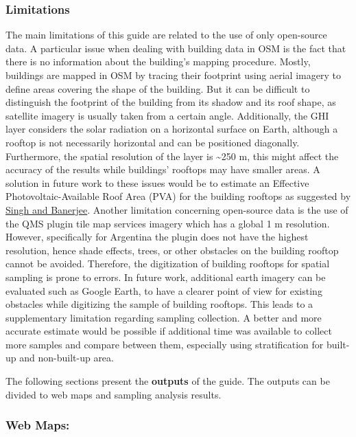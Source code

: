 \documentclass[
]{book}
\begin{document}
\hypertarget{limitations}{%
\subsubsection*{Limitations}\label{limitations}}

The main limitations of this guide are related to the use of only open-source data. A particular issue when dealing with building data in OSM is the fact that there is no information about the building's mapping procedure. Mostly, buildings are mapped in OSM by tracing their footprint using aerial imagery to define areas covering the shape of the building. But it can be difficult to distinguish the footprint of the building from its shadow and its roof shape, as satellite imagery is usually taken from a certain angle. Additionally, the GHI layer considers the solar radiation on a horizontal surface on Earth, although a rooftop is not necessarily horizontal and can be positioned diagonally. Furthermore, the spatial resolution of the layer is \textasciitilde250 m, this might affect the accuracy of the results while buildings' rooftops may have smaller areas. A solution in future work to these issues would be to estimate an Effective Photovoltaic-Available Roof Area (PVA) for the building rooftops as suggested by \href{https://doi.org/10.1016/j.solener.2015.03.016}{Singh and Banerjee}. Another limitation concerning open-source data is the use of the QMS plugin tile map services imagery which has a global 1 m resolution. However, specifically for Argentina the plugin does not have the highest resolution, hence shade effects, trees, or other obstacles on the building rooftop cannot be avoided. Therefore, the digitization of building rooftops for spatial sampling is prone to errors. In future work, additional earth imagery can be evaluated such as Google Earth, to have a clearer point of view for existing obstacles while digitizing the sample of building rooftops. This leads to a supplementary limitation regarding sampling collection. A better and more accurate estimate would be possible if additional time was available to collect more samples and compare between them, especially using stratification for built-up and non-built-up area.

The following sections present the \textbf{outputs} of the guide. The outputs can be divided to web maps and sampling analysis results.

\hypertarget{web-maps}{%
\subsubsection*{Web Maps:}\label{web-maps}}
\end{document}
